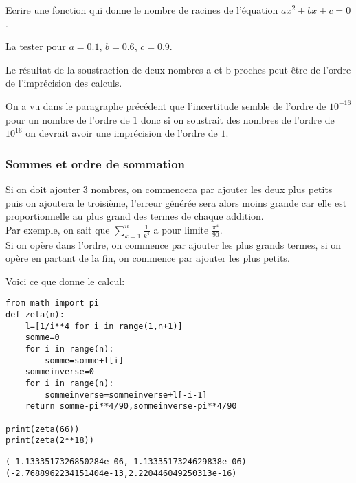 \begin{Exercise}[title={ Equation de degré 2}, label=edd]
Ecrire une fonction  qui donne le nombre de racines de l'équation $ax^{2}+bx+c=0$.

La tester pour $a = 0.1$, $b = 0.6$, $c = 0.9 $.
\end{Exercise}

Le résultat de la soustraction de deux nombres a et b proches peut être de l'ordre de l'imprécision des calculs.

On a vu dans le paragraphe précédent que l'incertitude semble de l'ordre de $10^{-16}$ pour un nombre de l'ordre de $1$ donc si on soustrait des nombres de l'ordre de $10^{16}$ on devrait avoir une imprécision de l'ordre de $1$.
\newpage
\subsubsection{Sommes et ordre de sommation}
Si on doit ajouter $3$ nombres, on commencera par ajouter les deux plus petits puis on ajoutera le troisième, l'erreur générée sera alors moins grande car elle est proportionnelle au plus grand des termes de chaque addition.\\
Par exemple, on sait que $\sum\limits_{k=1}^{n}\frac{1}{k^4}$ a pour limite $\frac{\pi^{4}}{90}$.\\
Si on opère dans l'ordre, on commence par ajouter les plus grands termes, si on opère en partant de la fin, on commence par ajouter les plus petits.

Voici ce que donne le calcul:
\begin{lstlisting}
from math import pi
def zeta(n):
    l=[1/i**4 for i in range(1,n+1)]
    somme=0
    for i in range(n):
        somme=somme+l[i]
    sommeinverse=0
    for i in range(n):
        sommeinverse=sommeinverse+l[-i-1]
    return somme-pi**4/90,sommeinverse-pi**4/90

print(zeta(66))
print(zeta(2**18))
\end{lstlisting}
\begin{lstlisting}
(-1.1333517326850284e-06,-1.1333517324629838e-06)
(-2.7688962234151404e-13,2.220446049250313e-16)
\end{lstlisting}
